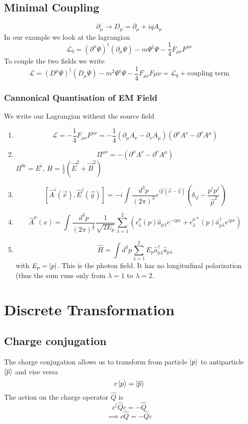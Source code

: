 \documentclass{report}
\begin{document}
\section{Minimal Coupling}
\[
\partial_\mu \to  D_\mu = \partial_\mu + i q A_\mu 
\] In our example we look at the lagrangian \[
\mathcal{L}_0 = \left( \partial^\mu \Psi  \right)^\dagger \left( \partial_\mu \Psi   \right) - m \Psi^\dagger\Psi - \frac{1}{4} F_{\mu \nu} F^{\mu \nu}
\] To couple the two fields we write \[
\mathcal{L} = \left( D^\mu \Psi  \right)^\dagger \left( D_\mu \Psi  \right) - m^2 \Psi^\dagger \Psi - \frac{1}{4} F_{\mu \nu} F{\mu \nu} = \mathcal{L}_0 + \text{coupling term}
\] 
\subsection{Cannonical Quantisation of EM Field}
We write our Lagrangian witheut the source field 
\begin{enumerate}
	\item \[
	\mathcal{L} = -\frac{1}{4} F_{\mu\nu} F^{\mu\nu} = - \frac{1}{4} \left( \partial_\mu A_\nu - \partial_\nu A_\mu    \right) \left( \partial^\mu A^\nu - \partial^\nu A^\mu   \right) 
\] 
\item \[
		\Pi^{\mu\nu} = -\left( \partial^\mu A^\nu - \partial^\nu  A^\mu   \right) 
	\] $\Pi^{0i} = E^i$,  $H = \frac{1}{2} \left( \vec{E}^2 + \vec{B}^2 \right) $ 
\item \[
		[\hat{A}^i(\vec{x}), \hat{E}^j(\vec{y})] = -i \int \frac{d^3p}{(2 \pi)^3} e^{i \vec{p} (\vec{x} - \vec{y})} \left( \delta_{ij} - \frac{p^i p^j}{\vec{p}^2} \right) 
\] 
\item \[
		\hat{A}^\mu(x) = \int \frac{d^3p}{(2 \pi)^{\frac{3}{2}}} \frac{1}{\sqrt{2 E_p} } \sum_{\lambda = 1}^{2} \left( \epsilon_\lambda^\mu(p) \hat{a}_{p \lambda} e^{-ipx} + \epsilon_\lambda^{\mu*}(p) \hat{a}_{p \lambda}^\dagger e^{ipx} \right) 
\] 
\item \[
		\hat{H} = \int d^3p \sum_{\lambda = 1}^{2} E_p \hat{a}_{p \lambda}^\dagger \hat{a}_{p\lambda}
	\] with $E_p = \abs{p}$. This is the photon field. It has no longitudinal polarization (thus the sum runs only from $\lambda = 1$ to $\lambda = 2$.
\end{enumerate}
\chapter{Discrete Transformation}
\section{Charge conjugation}
The charge conjugation allows us to transform from particle $\ket{p}$ to antiparticle $\ket{\overline{p}}$ and vise versa \[
c \ket{p} = \ket{\overline{p}}
\] The action on the charge operator $\hat{Q}$ is \[
c^\dagger \hat{Q} c = - \hat{Q}
\] \[
\implies c\hat{Q} = - \hat{Q} c
\] 
\end{document}
